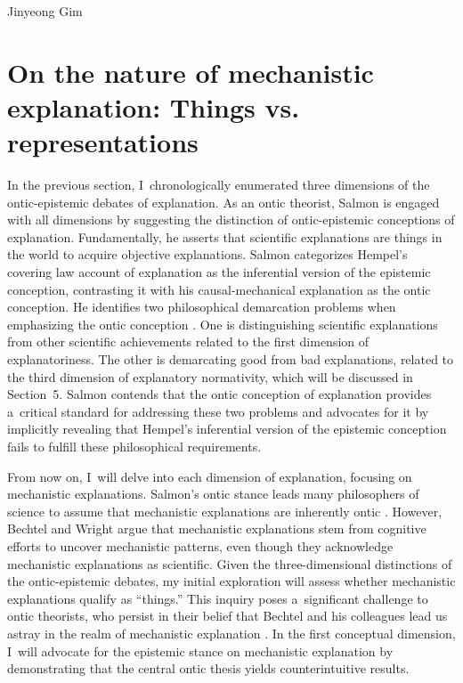 \begin{artengenv}{Jinyeong Gim}
\section{On the nature of mechanistic explanation: Things vs. representations}
In the previous section, I~chronologically enumerated three dimensions of the ontic-epistemic debates of explanation. As an ontic theorist, Salmon is engaged with all dimensions by suggesting the distinction of ontic-epistemic conceptions of explanation. Fundamentally, he asserts that scientific explanations are things in the world to acquire objective explanations. Salmon categorizes Hempel's covering law account of explanation as the inferential version of the epistemic conception, contrasting it with his causal-mechanical explanation as the ontic conception. He identifies two philosophical demarcation problems when emphasizing the ontic conception
\parencite[see][]{salmon_scientific_1984}. %
 One is distinguishing scientific explanations from other scientific achievements related to the first dimension of explanatoriness. The other is demarcating good from bad explanations, related to the third dimension of explanatory normativity, which will be discussed in Section~5. Salmon contends that the ontic conception of explanation provides a~critical standard for addressing these two problems and advocates for it by implicitly revealing that Hempel's inferential version of the epistemic conception fails to fulfill these philosophical requirements.

From now on, I~will delve into each dimension of explanation, focusing on mechanistic explanations. Salmon's ontic stance leads many philosophers of science to assume that mechanistic explanations are inherently ontic
\parencites[see][]{craver_explaining_2007}[][]{kaplan_explanatory_2011}[][]{povich_minimal_2018}. %
 However, Bechtel and Wright argue that mechanistic explanations stem from cognitive efforts to uncover mechanistic patterns, even though they acknowledge mechanistic explanations as scientific. Given the three-dimensional distinctions of the ontic-epistemic debates, my initial exploration will assess whether mechanistic explanations qualify as ``things.'' This inquiry poses a~significant challenge to ontic theorists, who persist in their belief that Bechtel and his colleagues lead us astray in the realm of mechanistic explanation 
\parencite[see][]{kaiser_ontic_2014}. %
 In the first conceptual dimension, I~will advocate for the epistemic stance on mechanistic explanation by demonstrating that the central ontic thesis yields counterintuitive results.


\end{artengenv}
